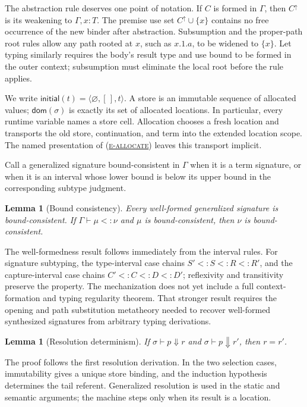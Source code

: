 \documentclass[acmsmall,screen,nonacm]{acmart}
\newtheorem{lemma}[theorem]{Lemma}
\newcommand{\ruleref}[1]{%
  \textsc{(\hyperref[rule:#1]{#1})}}
\newcommand{\cset}[1]{\{#1\}}
\newcommand{\resolve}{\Downarrow}
\begin{document}
The abstraction rule deserves one point of notation. If \(C\) is formed in
\(\Gamma\), then \(C^{\uparrow}\) is its weakening to
\(\Gamma,x:T\). The premise use set
\(C^{\uparrow}\cup\cset x\) contains no free occurrence of the new binder
after abstraction. Subsumption and the proper-path root rules allow any path
rooted at \(x\), such as \(x.1.a\), to be widened to \(\cset x\). Let
typing similarly requires the body's result type and use bound to be
formed in the outer context; subsumption must eliminate the local root before
the rule applies.

We write
\(\mathsf{initial}(t)=\langle\varnothing,[\,],t\rangle\).  A store is an
immutable sequence of allocated values; \(\mathsf{dom}(\sigma)\) is exactly
its set of allocated locations.  In particular, every runtime variable names
a store cell.  Allocation chooses a fresh location and transports the old
store, continuation, and term into the extended location scope.  The named
presentation of \ruleref{e-allocate} leaves this transport implicit.

Call a generalized signature bound-consistent in \(\Gamma\) when it is a
term signature, or when it is an interval whose lower bound is below its
upper bound in the corresponding subtype judgment.

\begin{lemma}[Bound consistency]
\label{lem:bound-consistency}
Every well-formed generalized signature is bound-consistent.  If
\(\Gamma\vdash\mu<:\nu\) and \(\mu\) is bound-consistent, then \(\nu\) is
bound-consistent.
\end{lemma}

The well-formedness result follows immediately from the interval rules.  For
signature subtyping, the type-interval case chains
\(S'<:S<:R<:R'\), and the capture-interval case chains
\(C'<:C<:D<:D'\); reflexivity and transitivity preserve the property.
The mechanization does not yet include a full context-formation and typing
regularity theorem.  That stronger result requires the opening and path
substitution metatheory needed to recover well-formed synthesized signatures
from arbitrary typing derivations.

\begin{lemma}[Resolution determinism]
\label{lem:resolution-determinism}
If \(\sigma\vdash p\resolve r\) and
\(\sigma\vdash p\resolve r'\), then \(r=r'\).
\end{lemma}

The proof follows the first resolution derivation.  In the two selection
cases, immutability gives a unique store binding, and the induction
hypothesis determines the tail referent.  Generalized resolution is used in
the static and semantic arguments; the machine steps only when its result is
a location.
\end{document}
